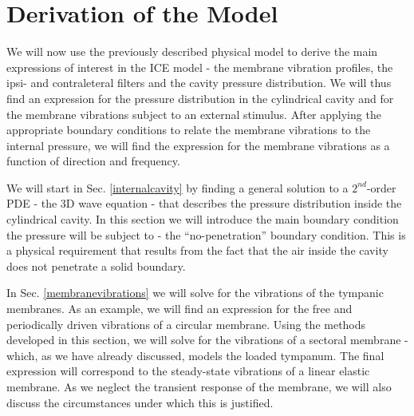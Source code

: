 \section{Derivation of the Model}
We will now use the previously described physical model to derive the main expressions of interest in the ICE model - the membrane
vibration profiles, the ipsi- and contraleteral filters and the cavity pressure distribution. We will thus find an expression for the pressure 
distribution in the cylindrical cavity and for the membrane vibrations subject to an external stimulus. After applying the 
appropriate boundary conditions to relate the membrane vibrations to the internal pressure, we will find the expression for the membrane
vibrations as a function of direction and frequency.

We will start in Sec. \ref{internalcavity} by finding a general solution to a $2^{nd}$-order PDE - the $3$D wave
equation - that describes the pressure distribution inside the cylindrical cavity. In this section we will introduce the
main boundary condition the pressure will be subject to - the ``no-penetration'' boundary condition. This is a physical requirement that results from the fact that the air
inside the cavity does not penetrate a solid boundary.

In Sec. \ref{membranevibrations} we will solve for the vibrations of the tympanic membranes. As an example, we
will find an expression for the free and periodically driven vibrations of a circular membrane. Using the methods
developed in this section, we will solve for the vibrations of a sectoral membrane - which, as we have already discussed,
models the loaded tympanum. The final expression will correspond to the steady-state vibrations of a linear elastic
membrane. As we neglect the transient response of the membrane, we will also discuss the circumstances under which this
is justified.

